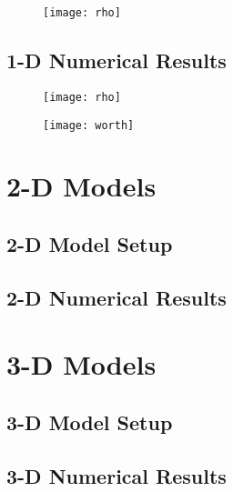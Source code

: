 \begin{figure}[htb!]
  \centering
  \texttt{[image: rho]}
  \caption{}
  \label{fig:1d-rho}
\end{figure}

\subsection{1-D Numerical Results}

\begin{figure}[htb!]
  \centering
  \texttt{[image: rho]}
  \caption{}
  \label{fig:1d-rho}
\end{figure}

\begin{figure}[htb!]
  \centering
  \texttt{[image: worth]}
  \caption{}
  \label{fig:1d-worth}
\end{figure}

\section{2-D Models}

\subsection{2-D Model Setup}

\subsection{2-D Numerical Results}

\section{3-D Models}

\subsection{3-D Model Setup}

\subsection{3-D Numerical Results}
